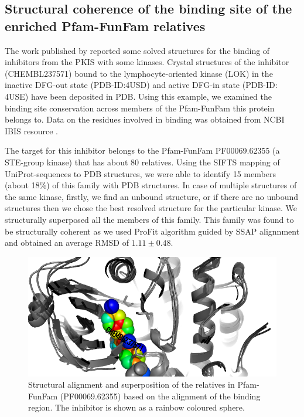 \documentclass[a4paper, 11pt]{report}
\begin{document}
\subsection{Structural coherence of the binding site of the enriched Pfam-FunFam relatives}
The work published by \cite{elkins2016comprehensive} reported some solved structures for the binding of inhibitors from the PKIS with some kinases. Crystal structures of the inhibitor (CHEMBL237571) bound to the lymphocyte-oriented kinase (LOK) in the inactive DFG-out state (PDB-ID:4USD) and active DFG-in state (PDB-ID: 4USE) have been deposited in PDB. Using this example, we examined the binding site conservation across members of the Pfam-FunFam this protein belongs to. Data on the residues involved in binding was obtained from NCBI IBIS resource \cite{shoemaker2011ibis}.\par
The target for this inhibitor belongs to the Pfam-FunFam PF00069.62355 (a STE-group kinase) that has about 80 relatives. Using the SIFTS mapping of UniProt-sequences to PDB structures, we were able to identify 15 members (about 18\%) of this family with PDB structures. In case of multiple structures of the same kinase, firstly, we find an unbound structure, or if there are no unbound structures then we chose the best resolved structure for the particular kinase. We structurally superposed all the members of this family. This family was found to be structurally coherent as we used ProFit algorithm guided by SSAP alignnment and obtained an average RMSD of $1.11 \pm 0.48$. 
\begin{figure}[H]
	\includegraphics[width=.7\linewidth]{figures/gskstruc33.png}
	\centering
	\caption{Structural alignment and superposition of the relatives in Pfam-FunFam (PF00069.62355) based on the alignment of the binding region. The inhibitor is shown as a rainbow coloured sphere.}
	\label{struct_align}
\end{figure}
\end{document}
